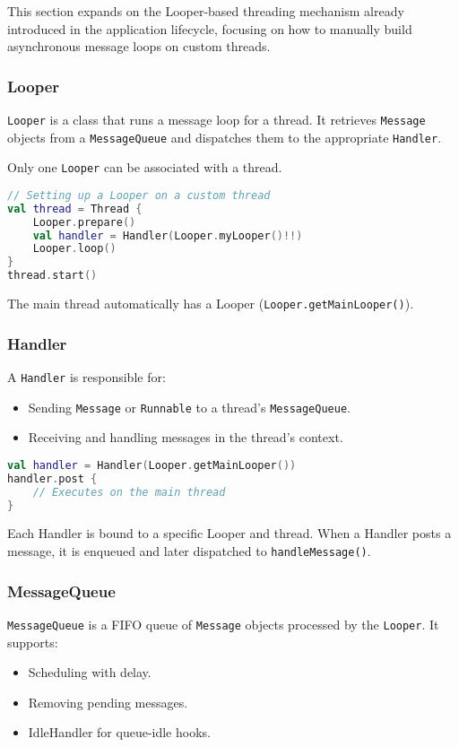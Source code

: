 \documentclass[a4paper,12pt]{article}
\begin{document}
This section expands on the Looper-based threading mechanism already introduced in the application lifecycle, focusing on how to manually build asynchronous message loops on custom threads.

\subsubsection{Looper}

\texttt{Looper} is a class that runs a message loop for a thread. It retrieves \texttt{Message} objects from a \texttt{MessageQueue} and dispatches them to the appropriate \texttt{Handler}.

Only one \texttt{Looper} can be associated with a thread.

\begin{lstlisting}[language=Kotlin]
// Setting up a Looper on a custom thread
val thread = Thread {
    Looper.prepare()
    val handler = Handler(Looper.myLooper()!!)
    Looper.loop()
}
thread.start()
\end{lstlisting}

The main thread automatically has a Looper (\texttt{Looper.getMainLooper()}).

\subsubsection{Handler}

A \texttt{Handler} is responsible for:
\begin{itemize}
  \item Sending \texttt{Message} or \texttt{Runnable} to a thread’s \texttt{MessageQueue}.
  \item Receiving and handling messages in the thread’s context.
\end{itemize}

\begin{lstlisting}[language=Kotlin]
val handler = Handler(Looper.getMainLooper())
handler.post {
    // Executes on the main thread
}
\end{lstlisting}

Each Handler is bound to a specific Looper and thread. When a Handler posts a message, it is enqueued and later dispatched to \texttt{handleMessage()}.

\subsubsection{MessageQueue}

\texttt{MessageQueue} is a FIFO queue of \texttt{Message} objects processed by the \texttt{Looper}. It supports:
\begin{itemize}
  \item Scheduling with delay.
  \item Removing pending messages.
  \item IdleHandler for queue-idle hooks.
\end{itemize}
\end{document}

